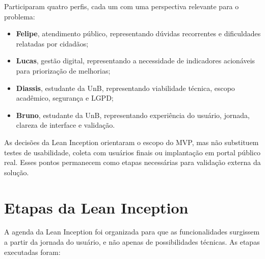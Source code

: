 Participaram quatro perfis, cada um com uma perspectiva relevante para o
problema:

\begin{itemize}
    \item \textbf{Felipe}, atendimento público, representando dúvidas
    recorrentes e dificuldades relatadas por cidadãos;
    \item \textbf{Lucas}, gestão digital, representando a necessidade de
    indicadores acionáveis para priorização de melhorias;
    \item \textbf{Diassis}, estudante da UnB, representando viabilidade técnica,
    escopo acadêmico, segurança e LGPD;
    \item \textbf{Bruno}, estudante da UnB, representando experiência do usuário,
    jornada, clareza de interface e validação.
\end{itemize}

As decisões da Lean Inception orientaram o escopo do MVP, mas não substituem
testes de usabilidade, coleta com usuários finais ou implantação em portal
público real. Esses pontos permanecem como etapas necessárias para validação
externa da solução.

\section{Etapas da Lean Inception}

A agenda da Lean Inception foi organizada para que as funcionalidades surgissem a
partir da jornada do usuário, e não apenas de possibilidades técnicas. As etapas
executadas foram:

